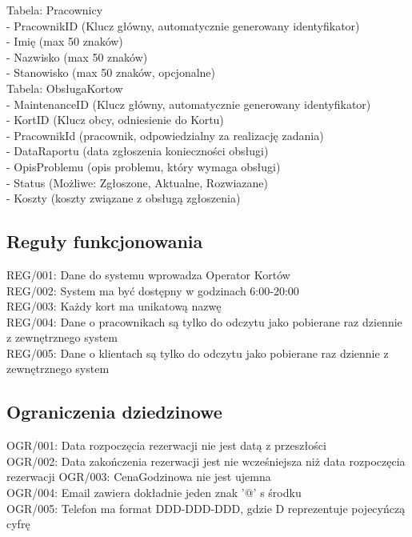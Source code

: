 \documentclass{article}
\begin{document}
Tabela: Pracownicy\\
- PracownikID (Klucz główny, automatycznie generowany identyfikator)\\
- Imię (max 50 znaków)\\
- Nazwisko (max 50 znaków)\\
- Stanowisko (max 50 znaków, opcjonalne)\\

Tabela: ObsługaKortow\\
- MaintenanceID (Klucz główny, automatycznie generowany identyfikator)\\
- KortID (Klucz obcy, odniesienie do Kortu)\\
- PracownikId (pracownik, odpowiedzialny za realizację zadania)\\
- DataRaportu (data zgłoszenia konieczności obsługi)\\
- OpisProblemu (opis problemu, który wymaga obsługi)\\
- Status (Możliwe: Zgłoszone, Aktualne, Rozwiazane)\\
- Koszty (koszty związane z obsługą zgłoszenia)\\

\subsection*{Reguły funkcjonowania}

\noindent
REG/001: Dane do systemu wprowadza Operator Kortów\\
REG/002: System ma być dostępny w godzinach 6:00-20:00\\
REG/003: Każdy kort ma unikatową nazwę\\
REG/004: Dane o pracownikach są tylko do odczytu jako pobierane raz dziennie z zewnętrznego system\\
REG/005: Dane o klientach są tylko do odczytu jako pobierane raz dziennie z zewnętrznego system\\

\subsection*{Ograniczenia dziedzinowe}

\noindent
OGR/001: Data rozpoczęcia rezerwacji nie jest datą z przeszłości\\
OGR/002: Data zakończenia  rezerwacji jest nie wcześniejsza niż data rozpoczęcia rezerwacji
OGR/003: CenaGodzinowa nie jest ujemna\\
OGR/004: Email zawiera dokładnie jeden znak '@' s środku\\
OGR/005: Telefon ma format DDD-DDD-DDD, gdzie D reprezentuje pojecyńczą cyfrę
\end{document}
